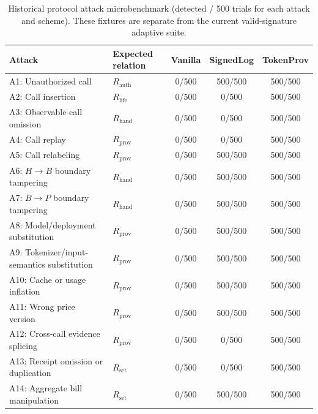 \begin{table}[!t]
\centering
\caption{Historical protocol attack microbenchmark (detected / 500 trials for each attack and scheme). These fixtures are separate from the current valid-signature adaptive suite.}
\label{tab:e-historical-attack-coverage}
\footnotesize
\renewcommand{\arraystretch}{1.10}
\begin{tabular*}{\textwidth}{@{\hspace{4pt}}l@{\extracolsep{\fill}}lccc@{\hspace{4pt}}}
\toprule
\textbf{Attack} & \textbf{Expected relation} & \textbf{Vanilla} & \textbf{SignedLog} & \textbf{TokenProv} \\
\midrule
A1: Unauthorized call & $R_{\mathrm{auth}}$ & 0/500 & 500/500 & 500/500 \\
A2: Call insertion & $R_{\mathrm{life}}$ & 0/500 & 0/500 & 500/500 \\
A3: Observable-call omission & $R_{\mathrm{hand}}$ & 0/500 & 0/500 & 500/500 \\
A4: Call replay & $R_{\mathrm{prov}}$ & 0/500 & 0/500 & 500/500 \\
A5: Call relabeling & $R_{\mathrm{prov}}$ & 0/500 & 500/500 & 500/500 \\
A6: $H\!\rightarrow\!B$ boundary tampering & $R_{\mathrm{hand}}$ & 0/500 & 500/500 & 500/500 \\
A7: $B\!\rightarrow\!P$ boundary tampering & $R_{\mathrm{hand}}$ & 0/500 & 500/500 & 500/500 \\
A8: Model/deployment substitution & $R_{\mathrm{prov}}$ & 0/500 & 500/500 & 500/500 \\
A9: Tokenizer/input-semantics substitution & $R_{\mathrm{prov}}$ & 0/500 & 500/500 & 500/500 \\
A10: Cache or usage inflation & $R_{\mathrm{prov}}$ & 0/500 & 500/500 & 500/500 \\
A11: Wrong price version & $R_{\mathrm{prov}}$ & 0/500 & 500/500 & 500/500 \\
A12: Cross-call evidence splicing & $R_{\mathrm{prov}}$ & 0/500 & 0/500 & 500/500 \\
A13: Receipt omission or duplication & $R_{\mathrm{set}}$ & 0/500 & 0/500 & 500/500 \\
A14: Aggregate bill manipulation & $R_{\mathrm{set}}$ & 0/500 & 500/500 & 500/500 \\
\bottomrule
\end{tabular*}
\end{table}


